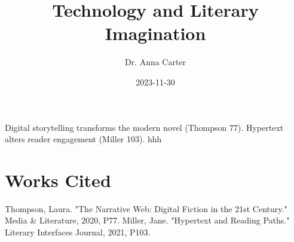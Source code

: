 \documentclass{article}
\title{Technology and Literary Imagination}
\author{Dr. Anna Carter}
\date{2023-11-30}
\begin{document}
\maketitle
Digital storytelling transforms the modern novel (Thompson 77). Hypertext alters reader engagement (Miller 103). hhh

\section{Works Cited}
Thompson, Laura. "The Narrative Web: Digital Fiction in the 21st Century." Media \& Literature, 2020, P77.
Miller, Jane. "Hypertext and Reading Paths." Literary Interfaces Journal, 2021, P103.
\end{document}
